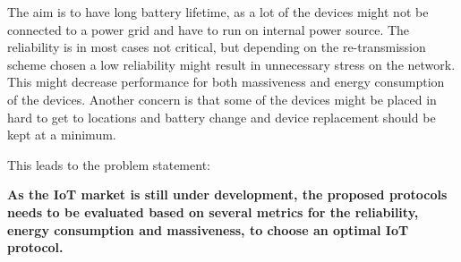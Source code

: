 The aim is to have long battery lifetime, as a lot of the devices might not be connected to a power grid and have to run on internal power source. The reliability is in most cases not critical, but depending on the re-transmission scheme chosen a low reliability might result in unnecessary stress on the network. This might decrease performance for both massiveness and energy consumption of the devices. Another concern is that some of the devices might be placed in hard to get to locations and battery change and device replacement should be kept at a minimum.



This leads to the problem statement:
\begin{center}
\textbf{As the IoT market is still under development, the proposed protocols needs to be evaluated based on several metrics for the reliability, energy consumption and massiveness, to choose an optimal IoT protocol.}
\end{center}

